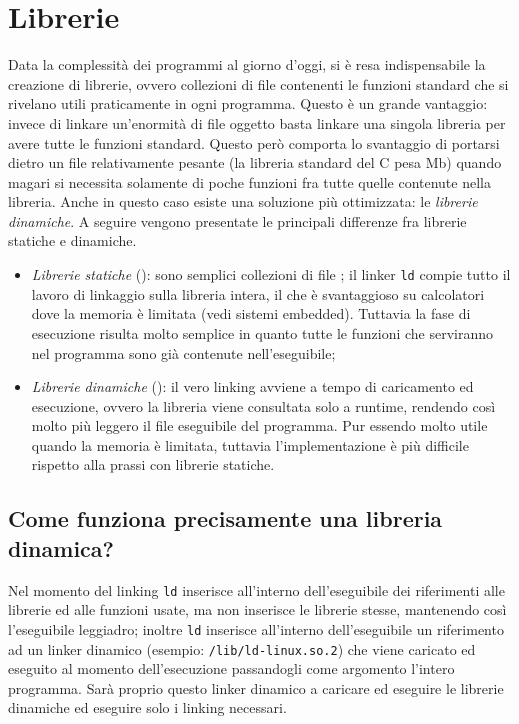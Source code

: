 \documentclass[class=book, crop=false, oneside]{standalone}
\begin{document}
\section{Librerie}
Data la complessità dei programmi al giorno d'oggi, si è resa indispensabile la creazione di librerie, ovvero collezioni di file  contenenti le funzioni standard che si rivelano utili praticamente in ogni programma.
Questo è un grande vantaggio: invece di linkare un'enormità di file oggetto basta linkare una singola libreria per avere tutte le funzioni standard. Questo però comporta lo svantaggio di portarsi dietro un file relativamente pesante (la libreria standard del C pesa \unit[2,5]{Mb}) quando magari si necessita solamente di poche funzioni fra tutte quelle contenute nella libreria. Anche in questo caso esiste una soluzione più ottimizzata: le \emph{librerie dinamiche}. A seguire vengono presentate le principali differenze fra librerie statiche e dinamiche.
\begin{itemize}
	\item \emph{Librerie statiche} (): sono semplici collezioni di file ; il linker \texttt{ld} compie tutto il lavoro di linkaggio sulla libreria intera, il che è svantaggioso su calcolatori dove la memoria è limitata (vedi sistemi embedded). Tuttavia la fase di esecuzione risulta molto semplice in quanto tutte le funzioni che serviranno nel programma sono già contenute nell'eseguibile;
	\item \emph{Librerie dinamiche} (): il vero linking avviene a tempo di caricamento ed esecuzione, ovvero la libreria viene consultata solo a runtime, rendendo così molto più leggero il file eseguibile del programma. Pur essendo molto utile quando la memoria è limitata, tuttavia l'implementazione è più difficile rispetto alla prassi con librerie statiche.
\end{itemize}

\subsection{Come funziona precisamente una libreria dinamica?}
Nel momento del linking \texttt{ld} inserisce all'interno dell'eseguibile dei riferimenti alle librerie ed alle funzioni usate, ma non inserisce le librerie stesse, mantenendo così l'eseguibile leggiadro; inoltre \texttt{ld} inserisce all'interno dell'eseguibile un riferimento ad un linker dinamico (esempio: \texttt{/lib/ld-linux.so.2}) che viene caricato ed eseguito al momento dell'esecuzione passandogli come argomento l'intero programma. Sarà proprio questo linker dinamico a caricare ed eseguire le librerie dinamiche ed eseguire solo i linking necessari.
\end{document}

